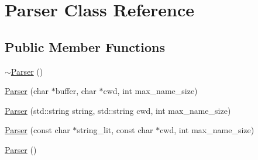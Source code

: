 \hypertarget{classParser}{}\section{Parser Class Reference}
\label{classParser}
\subsection*{Public Member Functions}
\begin{DoxyCompactItemize}
\item 
\mbox{\hyperlink{classParser_a3e658b5917a93a3ef648050d060e3a93}{$\sim$\+Parser}} ()
\end{DoxyCompactItemize}
\textbf{ }\par
\begin{DoxyCompactItemize}
\item 
\mbox{\hyperlink{classParser_a306c6c33d7a6cf1bb682be360fcfe982}{Parser}} (char $\ast$buffer, char $\ast$cwd, int max\+\_\+name\+\_\+size)
\item 
\mbox{\hyperlink{classParser_ada33680bf5f723ef95c44eeed1bff451}{Parser}} (std\+::string string, std\+::string cwd, int max\+\_\+name\+\_\+size)
\item 
\mbox{\hyperlink{classParser_a5168f5c44e9649e71796f9bef48bdbbe}{Parser}} (const char $\ast$string\+\_\+lit, const char $\ast$cwd, int max\+\_\+name\+\_\+size)
\item 
\mbox{\hyperlink{classParser_a12234f6cd36b61af4b50c94a179422c1}{Parser}} ()
\end{DoxyCompactItemize}

